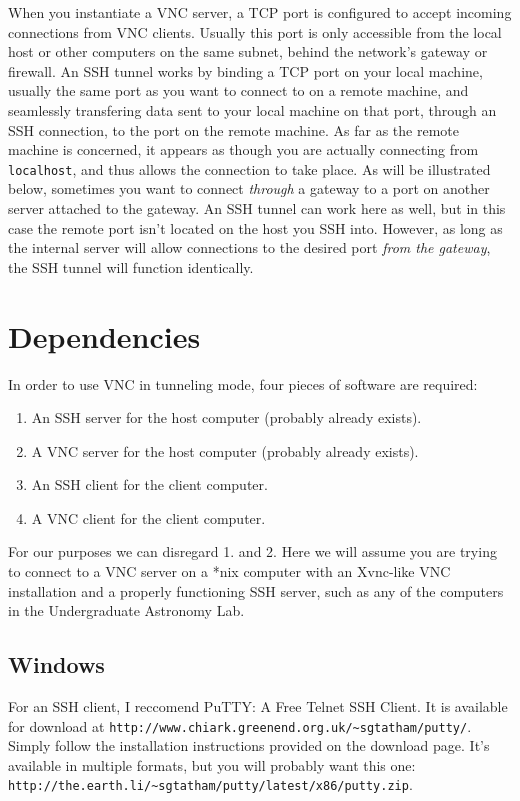 \documentclass[11pt,preprint]{aastex}
\begin{document}
When you instantiate a VNC server, a TCP port is configured to accept incoming connections from VNC clients.  Usually this port is only accessible from the local host or other 
computers on the same subnet, behind the network's gateway or firewall.  An SSH tunnel works by binding a TCP port on your local machine, usually the same port as you want
to connect to on a remote machine, and seamlessly transfering data sent to your local machine on that port, through an SSH connection, to the port on the remote machine.  As far as the remote machine
is concerned, it appears as though you are actually connecting from \verb$localhost$, and thus allows the connection to take place.  As will be illustrated below, sometimes you want to
connect \emph{through} a gateway to a port on another server attached to the gateway.  An SSH tunnel can work here as well, but in this case the remote port isn't located on the host you SSH
into.  However, as long as the internal server will allow connections to the desired port \emph{from the gateway}, the SSH tunnel will function identically.
          

\section{Dependencies}

In order to use VNC in tunneling mode, four pieces of software are required:
\begin{enumerate}
\item An SSH server for the host computer (probably already exists).
\item A VNC server for the host computer (probably already exists).
\item An SSH client for the client computer.
\item A VNC client for the client computer.
\end{enumerate}
For our purposes we can disregard 1. and 2.  Here we will assume you are trying to connect to a VNC
server on a *nix computer with an Xvnc-like VNC installation and a properly functioning SSH server, such as any of the computers in the Undergraduate Astronomy Lab.

\subsection{Windows}
For an SSH client, I reccomend PuTTY: A Free Telnet SSH Client.  
It is available for download at \verb$http://www.chiark.greenend.org.uk/~sgtatham/putty/$.  Simply follow the installation
instructions provided on the download page.  It's available in multiple formats, but you will probably want 
this one: \verb$http://the.earth.li/~sgtatham/putty/latest/x86/putty.zip$.
\end{document}
